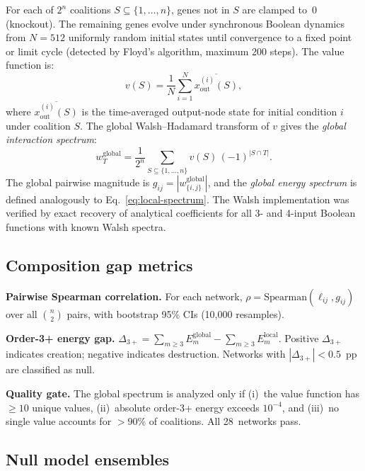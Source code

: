 \documentclass[10pt]{article}
\begin{document}
For each of $2^n$ coalitions $S \subseteq \{1,\ldots,n\}$, genes not
in $S$ are clamped to~0 (knockout). The remaining genes evolve under
synchronous Boolean dynamics from $N = 512$ uniformly random initial
states until convergence to a fixed point or limit cycle (detected by
Floyd's algorithm, maximum 200 steps). The value function is:
%
\begin{equation}
\label{eq:value}
v(S) = \frac{1}{N} \sum_{i=1}^{N}
\overline{x_{\mathrm{out}}^{(i)}(S)},
\end{equation}
%
where $\overline{x_{\mathrm{out}}^{(i)}(S)}$ is the time-averaged
output-node state for initial condition $i$ under coalition $S$. The
global Walsh--Hadamard transform of $v$ gives the \emph{global
interaction spectrum}:
%
\begin{equation}
\label{eq:global-wht}
w_T^{\mathrm{global}} = \frac{1}{2^n} \sum_{S \subseteq \{1,\ldots,n\}}
v(S)\,(-1)^{|S \cap T|}.
\end{equation}
%
The global pairwise magnitude is
$g_{ij} = |w_{\{i,j\}}^{\mathrm{global}}|$, and the
\emph{global energy spectrum} is defined analogously to
Eq.~\ref{eq:local-spectrum}. The Walsh implementation was verified
by exact recovery of analytical coefficients for all 3- and 4-input
Boolean functions with known Walsh spectra.


\subsection{Composition gap metrics}
\label{sec:metrics}

\textbf{Pairwise Spearman correlation.}
For each network, $\rho = \mathrm{Spearman}(\ell_{ij}, g_{ij})$ over
all $\binom{n}{2}$ pairs, with bootstrap 95\% CIs (10{,}000
resamples).

\textbf{Order-3+ energy gap.}
$\Delta_{3+} = \sum_{m \geq 3} E_m^{\mathrm{global}}
- \sum_{m \geq 3} E_m^{\mathrm{local}}.$
Positive $\Delta_{3+}$ indicates creation; negative indicates
destruction. Networks with $|\Delta_{3+}| < 0.5$~pp are classified as
null.

\textbf{Quality gate.}
The global spectrum is analyzed only if (i)~the value function has
$\geq 10$ unique values, (ii)~absolute order-3+ energy exceeds
$10^{-4}$, and (iii)~no single value accounts for $> 90\%$ of
coalitions. All 28~networks pass.


\subsection{Null model ensembles}
\label{sec:null-models}
\end{document}
